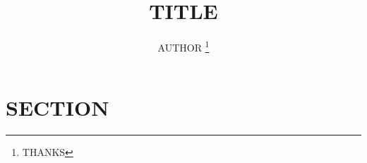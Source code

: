 \documentclass[dvipdfmx,a4paper,uplatex,titlepage]{jsarticle}
\title{TITLE}
\author{AUTHOR \thanks{THANKS}}
\begin{document}
\maketitle


\section{SECTION}

\end{document}
